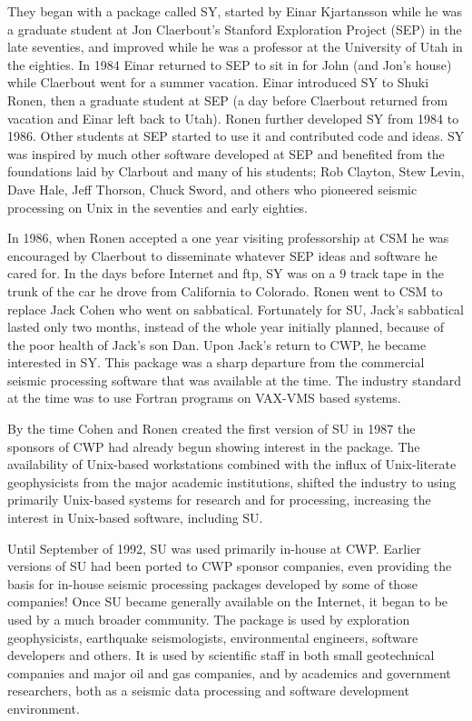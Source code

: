 They began with a package called SY, started by Einar Kjartansson while
he was a graduate student at Jon Claerbout's Stanford Exploration Project
(SEP) in the late seventies, and improved while he was a professor at 
the University of Utah in the eighties.  In 1984 Einar returned to 
SEP to sit in for John (and Jon's house) while Claerbout went 
for a summer vacation.
Einar introduced SY to Shuki Ronen, then a graduate student at SEP (a day
before Claerbout returned from vacation and Einar left back to Utah).
Ronen further developed SY from 1984 to 1986.   Other students at SEP
started to use it and contributed code and ideas.  SY was inspired by much
other software developed at SEP and benefited from the foundations laid by
Clarbout and many of his students; Rob Clayton, Stew Levin, Dave Hale, Jeff
Thorson, Chuck Sword, and others who pioneered seismic processing on Unix
in the seventies and early eighties.  

In 1986, when Ronen accepted a one
year visiting professorship at CSM he was encouraged by Claerbout to
disseminate whatever SEP ideas and software he cared for.  In the days
before Internet and ftp, SY was on a 9 track tape in the trunk of the car
he drove from California to Colorado.  Ronen went to CSM to replace Jack
Cohen who went on sabbatical.  Fortunately for SU, Jack's sabbatical lasted
only two months, instead of the whole year initially planned, because of the
poor health of Jack's son Dan. Upon Jack's return to CWP, he became
interested in SY.  This package was a sharp departure from the commercial
seismic processing software that was available at the time. The industry
standard at the time was to use Fortran programs on VAX-VMS based systems.

By the time Cohen and Ronen created the first version of SU in 1987 the
sponsors of CWP had already begun showing interest in the package. The
availability of Unix-based workstations combined with the influx of
Unix-literate geophysicists from the major academic institutions, shifted
the industry to using primarily Unix-based systems for research and for
processing, increasing the interest in Unix-based software, including SU.

Until September of 1992, SU was used primarily in-house at CWP. Earlier
versions of SU had been ported to CWP sponsor companies, even providing the
basis for in-house seismic processing packages developed by some of those
companies! Once SU became generally available on the Internet, it began to
be used by a much broader community. The package is used by exploration
geophysicists, earthquake seismologists, environmental engineers, software
developers and others. It is used by scientific staff in both small
geotechnical companies and major oil and gas companies, and by academics
and government researchers, both as a seismic data processing and software
development environment.

